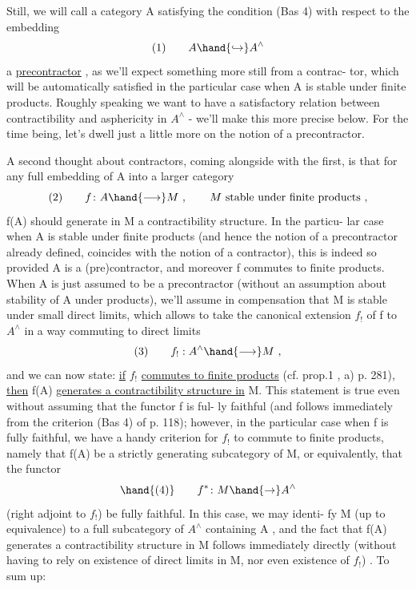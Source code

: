 
Still, we will call a category A satisfying the condition (Bas 4)
with respect to the embedding
\[ (1) \qquad A \hand{\hookrightarrow} A^{\wedge} \]
a \uline{precontractor} , as we'll expect something more still from a contrac-%
tor, which  will be automatically satisfied in the particular case
when A is stable under finite products. Roughly speaking we want to
have a satisfactory relation between contractibility and asphericity
in $A^{\wedge}$ - we'll make this more precise below. For the time being, 
let's dwell just a little more on the notion of a precontractor.

A second thought about contractors, coming alongside with the
first, is that for any full embedding of A into a larger category
\[ (2) \qquad f\colon A \hand{\longrightarrow} M \ , \qquad M \text{ stable under finite products ,} \]
f(A) should generate in M a contractibility structure. In the particu-%
lar case when A is stable under finite products (and hence the notion
of a precontractor\hand{,} already defined, coincides with the notion of a
contractor), this is indeed so provided A is  a (pre)contractor,
and moreover f commutes to finite products. When A is just assumed to
be a  precontractor (without an assumption about stability of
A under products), we'll assume in compensation that M is stable under
small direct limits, which allows to take the canonical extension $f_{!}$
of f to $A^{\wedge}$ in a way commuting to  direct limits
\[ (3) \qquad f_{!} : A^{\wedge} \hand{\longrightarrow} M \ , \]
and we can now state: \uline{if} $f_{!}$ \uline{commutes to finite products} (cf. prop.1 ,
a) p. 281), \uline{then} f(A) \uline{generates a contractibility structure in} M.
This statement is true even without assuming that the functor f is ful-%
ly faithful (and follows immediately from the criterion (Bas 4) of
p. 118); however, in the particular case when f is fully faithful,
we have a handy criterion  for $f_{!}$ to commute to finite products, namely
that f(A) be a strictly generating subcategory of M, or equivalently,
that the functor
\[ \hand{(4)} \qquad f^{*}\colon M \hand{\to} A^{\wedge} \]
(right adjoint to $f_{!}$) be fully faithful. In this case, we may identi-%
fy M (up to equivalence) to a full subcategory of $A^{\wedge}$ containing A ,
and the fact that f(A) generates a contractibility structure in M
follows immediately directly (without having to rely on existence of
direct limits in M, nor even existence of $f_{!}$) . To sum up:

